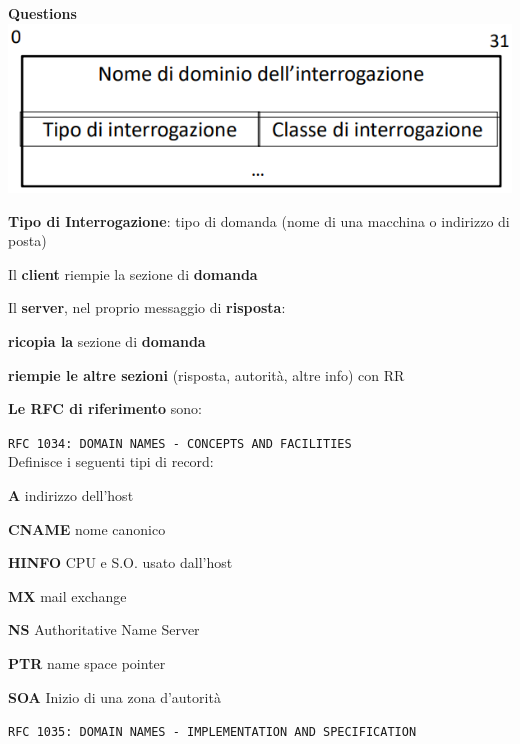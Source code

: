 \documentclass[10pt]{article}
\begin{document}
\begin{multicols}{2}
\textbf{Questions}\\
\includegraphics[scale=0.5]{dnsquestions.png}
\columnbreak
\begin{list}{}{}
\item \textbf{Tipo di Interrogazione}: tipo di domanda (nome di una macchina o indirizzo di posta)
\item Il \textbf{client} riempie la sezione di \textbf{domanda}
\item Il \textbf{server}, nel proprio messaggio di \textbf{risposta}:
\begin{list}{}{}
\item \textbf{ricopia la} sezione di \textbf{domanda}
\item \textbf{riempie le altre sezioni} (risposta, autorità, altre info) con RR
\end{list}
\end{list}
\end{multicols}
\textbf{Le RFC di riferimento} sono:
\begin{list}{}{}
\item \texttt{RFC 1034: DOMAIN NAMES - CONCEPTS AND FACILITIES}\\
Definisce i seguenti tipi di record:
\begin{list}{}{}
\item \textbf{A} indirizzo dell'host
\item \textbf{CNAME} nome canonico
\item \textbf{HINFO} CPU e S.O. usato dall'host
\item \textbf{MX} mail exchange
\item \textbf{NS} Authoritative Name Server
\item \textbf{PTR} name space pointer
\item \textbf{SOA} Inizio di una zona d'autorità
\end{list}
\item \texttt{RFC 1035: DOMAIN NAMES - IMPLEMENTATION AND SPECIFICATION}
\end{list}
\pagebreak
\end{document}
